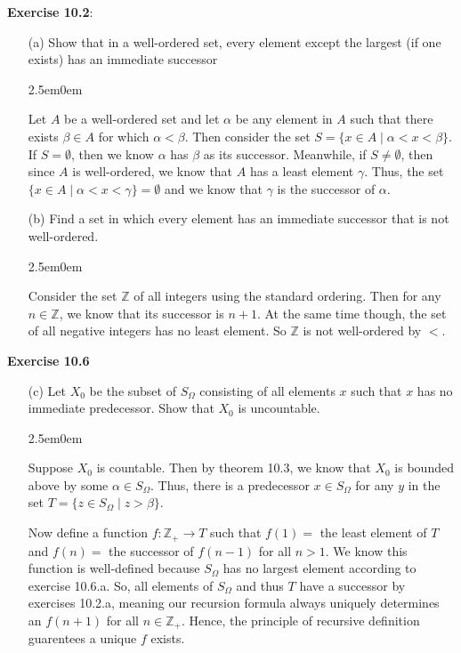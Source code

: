 \documentclass{book}
\newcommand{\exOne}{%
   \color{Purple}%
   \fontsize{14}{16}\selectfont%
}
\newcommand{\exTwo}{%
\color{Purple}%
   \fontsize{13}{15}\selectfont%
}
\newenvironment{myIndent}{%
   \begin{adjustwidth}{2.5em}{0em}%
}{%
   \end{adjustwidth}%
}
\newcommand{\blab}[1]{\textbf{#1}}
\newcommand{\retTwo}{\hfill\bigbreak}
\begin{document}
   \exOne
   \blab{Exercise 10.2}:  
   \begin{itemize}
       \item[(a)] Show that in a well-ordered set, every element except the largest (if one exists) has an immediate successor
       
      \begin{myIndent}\exTwo
         Let $A$ be a well-ordered set and let $\alpha$ be any element in $A$ such that there exists $\beta \in A$ for which $\alpha < \beta$. Then consider the set $S = \{x \in A \mid \alpha < x < \beta\}$. If $S = \emptyset$, then we know $\alpha$ has $\beta$ as its successor. Meanwhile, if $S \neq \emptyset$, then since $A$ is well-ordered, we know that $A$ has a least element $\gamma$. Thus, the set $\{x \in A \mid \alpha < x < \gamma\} = \emptyset$ and we know that $\gamma$ is the successor of $\alpha$.\retTwo
      \end{myIndent}

       \item[(b)] Find a set in which every element has an immediate successor that is not well-ordered. 
       \begin{myIndent}\exTwo
         Consider the set $\mathbb{Z}$ of all integers using the standard ordering. Then for any $n \in \mathbb{Z}$, we know that its successor is $n + 1$. At the same time though, the set of all negative integers has no least element. So $\mathbb{Z}$ is not well-ordered by $<$.\retTwo
      \end{myIndent}
   \end{itemize}

   \blab{Exercise 10.6}
      \begin{itemize}
         \item[(c)] Let $X_0$ be the subset of $S_\Omega$ consisting of all elements $x$ such that $x$ has no\\ immediate predecessor. Show that $X_0$ is uncountable.
         
         \begin{myIndent}\exTwo
            Suppose $X_0$ is countable. Then by theorem 10.3, we know that $X_0$ is bounded above by some $\alpha \in S_\Omega$. Thus, there is a predecessor $x \in S_\Omega$ for any $y$ in the set $T = \{z \in S_\Omega \mid z > \beta\}$.\newpage

            Now define a function $f: \mathbb{Z}_+ \longrightarrow T$ such that $f(1) =$ the least element of $T$ and $f(n) =$ the successor of $f(n - 1)$ for all $n > 1$. We know this function is well-defined because $S_\Omega$ has no largest element according to exercise 10.6.a. So, all elements of $S_\Omega$ and thus $T$ have a successor by exercises 10.2.a, meaning our recursion formula always uniquely determines an $f(n + 1)$ for all $n \in \mathbb{Z}_+$. Hence, the principle of recursive definition guarentees a unique $f$ exists.
         \end{myIndent}
      \end{itemize}

   \newpage
\end{document}

